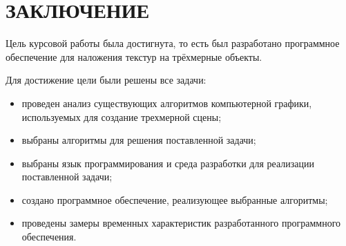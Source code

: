 \section*{\centering ЗАКЛЮЧЕНИЕ}

Цель курсовой работы была достигнута, то есть был разработано программное обеспечение для наложения текстур на трёхмерные объекты.

Для достижение цели были решены все задачи:
\begin{itemize}
	\item проведен анализ существующих алгоритмов компьютерной графики, используемых для создание трехмерной сцены;
	\item выбраны алгоритмы для решения поставленной задачи;
	\item выбраны язык программирования и среда разработки для реализации поставленной задачи;
	\item создано программное обеспечение, реализующее выбранные алгоритмы;
	\item проведены замеры временных характеристик разработанного программного обеспечения.  
\end{itemize}

